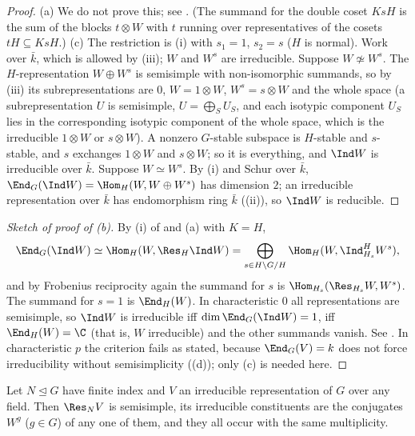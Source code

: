 \begin{proof}
(a) We do not prove this; see \cite[Section 7.3]{SerreLinearReps}. (The summand for the double coset $KsH$ is the sum of the blocks
$t\otimes W$ with $t$ running over representatives of the cosets $tH\subseteq KsH$.)
(c) The restriction is (i) with $s_1=1$, $s_2=s$ ($H$ is normal). Work over $\bar k$, which is allowed by
(iii); $W$ and $W^s$ are irreducible. Suppose $W\not\simeq W^s$. The $H$-representation $W\oplus W^s$ is semisimple
with non-isomorphic summands, so by (iii) its subrepresentations are $0$, $W=1\otimes W$, $W^s=s\otimes W$ and the whole
space (a subrepresentation $U$ is semisimple, $U=\bigoplus_SU_S$, and each isotypic component $U_S$ lies in the corresponding isotypic
component of the whole space, which is the irreducible $1\otimes W$ or $s\otimes W$). A nonzero $G$-stable subspace is $H$-stable and $s$-stable, and $s$ exchanges $1\otimes W$ and $s\otimes W$; so it is everything, and $\Ind W$
is irreducible over $\bar k$. Suppose $W\simeq W^s$. By (i) and Schur over $\bar k$,
$\End_G(\Ind W)=\Hom_H(W,W\oplus W^s)$ has dimension $2$; an irreducible representation over $\bar k$ has endomorphism ring $\bar k$
((ii)), so $\Ind W$ is reducible.
\end{proof}

\begin{proof}[Sketch of proof of (b)]
By (i) of  and (a) with $K=H$,
\[
\End_G(\Ind W)\simeq\Hom_H(W,\Res_H\Ind W)=\bigoplus_{s\in H\backslash G/H}\Hom_H(W,\Ind^H_{H_s}W^s),
\]
and by Frobenius reciprocity again the summand for $s$ is $\Hom_{H_s}(\Res_{H_s}W,W^s)$. The summand for $s=1$ is $\End_H(W)$. In characteristic $0$ all
representations are semisimple, so $\Ind W$ is irreducible iff $\dim\End_G(\Ind W)=1$, iff $\End_H(W)=\C$ (that is, $W$ irreducible) and the
other summands vanish. See \cite[Section 7.4]{SerreLinearReps}. In characteristic $p$ the criterion fails as stated, because
$\End_G(V)=k$ does not force irreducibility without semisimplicity ((d)); only (c) is needed here.
\end{proof}

\begin{theorem}[Clifford]\label{thm:reps:clifford}
Let $N\trianglelefteq G$ have finite index and $V$ an irreducible representation of $G$ over any field. Then $\Res_NV$ is semisimple, its
irreducible constituents are the conjugates $W^g$ ($g\in G$) of any one of them, and they all occur with the same multiplicity.
\end{theorem}

